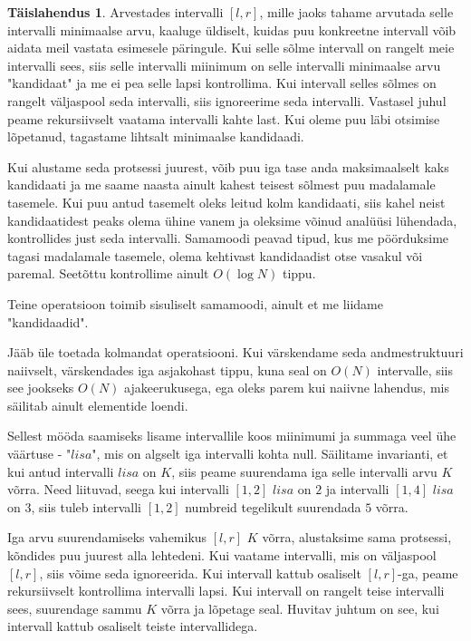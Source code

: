 \documentclass{trkut}
\theoremstyle{definition}
\newtheorem*{solution}{Täislahendus}
\begin{document}
\begin{solution}
Arvestades intervalli $[l,r]$, mille jaoks tahame arvutada selle intervalli minimaalse arvu, kaaluge üldiselt, kuidas puu konkreetne intervall võib aidata meil vastata esimesele päringule. Kui selle sõlme intervall on rangelt meie intervalli sees, siis selle intervalli miinimum on selle intervalli minimaalse arvu "kandidaat" ja me ei pea selle lapsi kontrollima. Kui intervall selles sõlmes on rangelt väljaspool seda intervalli, siis ignoreerime seda intervalli. Vastasel juhul peame rekursiivselt vaatama intervalli kahte last. Kui oleme puu läbi otsimise lõpetanud, tagastame lihtsalt minimaalse kandidaadi.

Kui alustame seda protsessi juurest, võib puu iga tase anda maksimaalselt kaks kandidaati ja me saame naasta ainult kahest teisest sõlmest puu madalamale tasemele. Kui puu antud tasemelt oleks leitud kolm kandidaati, siis kahel neist kandidaatidest peaks olema ühine vanem ja oleksime võinud analüüsi lühendada, kontrollides just seda intervalli. Samamoodi peavad tipud, kus me pöörduksime tagasi madalamale tasemele, olema kehtivast kandidaadist otse vasakul või paremal. Seetõttu kontrollime ainult $O(\log N)$ tippu.

Teine operatsioon toimib sisuliselt samamoodi, ainult et me liidame "kandidaadid".

Jääb üle toetada kolmandat operatsiooni. Kui värskendame seda andmestruktuuri naiivselt, värskendades iga asjakohast tippu, kuna seal on $O(N)$ intervalle, siis see jookseks $O(N)$ ajakeerukusega, ega oleks parem kui naiivne lahendus, mis säilitab ainult elementide loendi.

Sellest mööda saamiseks lisame intervallile koos miinimumi ja summaga veel ühe väärtuse - "$lisa$", mis on algselt iga intervalli kohta null. Säilitame invarianti, et kui antud intervalli $lisa$ on $K$, siis peame suurendama iga selle intervalli arvu $K$ võrra. Need liituvad, seega kui intervalli $[1,2]$ $lisa$ on $2$ ja intervalli $[1,4]$ $lisa$ on $3$, siis tuleb intervalli $[1,2]$ numbreid tegelikult suurendada $5$ võrra.

Iga arvu suurendamiseks vahemikus $[l,r]$ $K$ võrra, alustaksime sama protsessi, kõndides puu juurest alla lehtedeni. Kui vaatame intervalli, mis on väljaspool $[l,r]$, siis võime seda ignoreerida. Kui intervall kattub osaliselt $[l,r]$-ga, peame rekursiivselt kontrollima intervalli lapsi. Kui intervall on rangelt teise intervalli sees, suurendage sammu $K$ võrra ja lõpetage seal. 
Huvitav juhtum on see, kui intervall kattub osaliselt teiste intervallidega.


\end{solution}
\end{document}
